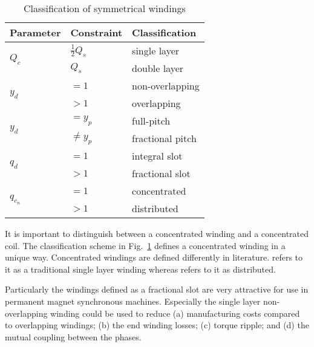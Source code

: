 {\renewcommand{\arraystretch}{1.2}
\begin{table}[htbp]
  \centering
  \caption{Classification of symmetrical windings}
  \label{fig:classification}
  \begin{tabular}{|l|l|l|}
  \hline
  Parameter  & Constraint  &  Classification  \\
  \hline
  \multirow{2}{*}{$Q_c$} & $\frac{1}{2}Q_s$ & single layer \\
                         & $Q_s$            & double layer \\
  \hline                        
  \multirow{2}{*}{$y_d$} & $=1$  & non-overlapping         \\
                         & $>1$  & overlapping             \\
  \hline                         
  \multirow{2}{*}{$y_d$} & $=y_p$     & full-pitch         \\
                         & $\neq y_p$ & fractional pitch   \\
  \hline                         
  \multirow{2}{*}{$q_d$} & $=1$     & integral slot        \\
                         & $>1$     & fractional slot      \\
  \hline                         
  \multirow{2}{*}{$q_{c_n}$} & $=1$     & concentrated     \\
                             & $>1$     & distributed      \\  
  \hline
  \end{tabular}
\end{table}}

It is important to distinguish between a concentrated winding and a concentrated coil. The classification scheme in Fig.~\ref{fig:classification} defines a concentrated winding in a unique way. Concentrated windings are defined differently in literature. \cite{REF-00814} refers to it as a traditional single layer winding whereas \cite{REF-00822} refers to it as distributed.

Particularly the windings defined as a fractional slot are very attractive for use in permanent magnet synchronous machines. Especially the single layer non-overlapping winding could be used to reduce (a) manufacturing costs compared to overlapping windings; (b) the end winding losses; (c) torque ripple; and (d) the mutual coupling between the phases.

